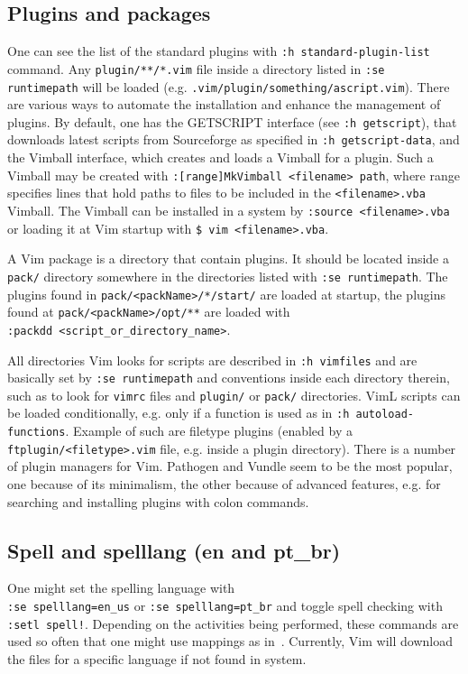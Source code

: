 \documentclass{article}
\newcommand{\tttt}[1]{\texttt{#1}}
\begin{document}
\subsection{Plugins and packages}
One can see the list of the standard plugins
with \tttt{:h standard-plugin-list} command.
Any \tttt{plugin/**/*.vim} file inside a directory
listed in \tttt{:se runtimepath} will be loaded
(e.g. \tttt{.vim/plugin/something/ascript.vim}).
There are various ways to automate the installation
and enhance the management of plugins.
By default, one has the GETSCRIPT interface (see \tttt{:h getscript}),
that downloads latest scripts from Sourceforge as specified in \tttt{:h getscript-data},
and the Vimball interface, which creates and loads a Vimball for a
plugin.
Such a Vimball may be created with \tttt{:[range]MkVimball <filename> path}, where range specifies lines
that hold paths to files to be included in the \tttt{<filename>.vba} Vimball.
The Vimball can be installed in a system by \tttt{:source <filename>.vba}
or loading it at Vim startup with \tttt{\$ vim <filename>.vba}.

A Vim package is a directory that contain plugins.
It should be located inside a \tttt{pack/} directory
somewhere in the directories listed with \tttt{:se runtimepath}.
The plugins found in \tttt{pack/<packName>/*/start/} are loaded
at startup, the plugins found at
\tttt{pack/<packName>/opt/**} are loaded with\\
\tttt{:packdd <script\_or\_directory\_name>}.

All directories Vim looks for scripts are described
in \tttt{:h vimfiles} and are basically set by
\tttt{:se runtimepath} and conventions inside
each directory therein, such as to look for \tttt{vimrc} files
and \tttt{plugin/} or \tttt{pack/} directories.
VimL scripts can be loaded conditionally,
e.g. only if a function is used as in \tttt{:h autoload-functions}.
Example of such are filetype plugins (enabled by a \tttt{ftplugin/<filetype>.vim} file,
e.g. inside a plugin directory).
There is a number of plugin managers for Vim.
Pathogen and Vundle seem to be the most popular,
one because of its minimalism, the other because of
advanced features, e.g. for searching and installing plugins with
colon commands.

\subsection{Spell and spelllang (en and pt\_br)}
One might set the spelling language with\\ \tttt{:se spelllang=en\_us}
or \tttt{:se spelllang=pt\_br}
and toggle spell checking with \tttt{:setl spell!}.
Depending on the activities being performed,
these commands are used so often that one might use mappings as in~\cite{vimrc}.
Currently, Vim will download the files for a specific language if
not found in system.
\end{document}
